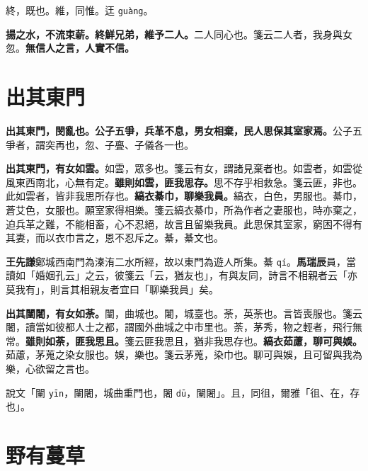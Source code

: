 \begin{quoting}終，既也。維，同惟。迋 \texttt{guàng}。\end{quoting}

\textbf{揚之水，不流束薪。終鮮兄弟，維予二人。}{\footnotesize 二人同心也。箋云二人者，我身與女忽。}\textbf{無信人之言，人實不信。}

\section{出其東門}


\textbf{出其東門，閔亂也。公子五爭，兵革不息，男女相棄，民人思保其室家焉。}{\footnotesize 公子五爭者，謂突再也，忽、子亹、子儀各一也。}

\textbf{出其東門，有女如雲。}{\footnotesize 如雲，眾多也。箋云有女，謂諸見棄者也。如雲者，如雲從風東西南北，心無有定。}\textbf{雖則如雲，匪我思存。}{\footnotesize 思不存乎相救急。箋云匪，非也。此如雲者，皆非我思所存也。}\textbf{縞衣綦巾，聊樂我員。}{\footnotesize 縞衣，白色，男服也。綦巾，蒼艾色，女服也。願室家得相樂。箋云縞衣綦巾，所為作者之妻服也，時亦棄之，迫兵革之難，不能相畜，心不忍絕，故言且留樂我員。此思保其室家，窮困不得有其妻，而以衣巾言之，恩不忍斥之。綦，綦文也。}

\begin{quoting}\textbf{王先謙}鄭城西南門為溱洧二水所經，故以東門為遊人所集。綦 \texttt{qí}。\textbf{馬瑞辰}員，當讀如「婚姻孔云」之云，彼箋云「云，猶友也」，有與友同，詩言不相親者云「亦莫我有」，則言其相親友者宜曰「聊樂我員」矣。\end{quoting}

\textbf{出其闉闍，有女如荼。}{\footnotesize 闉，曲城也。闍，城臺也。荼，英荼也。言皆喪服也。箋云闍，讀當如彼都人士之都，謂國外曲城之中市里也。荼，茅秀，物之輕者，飛行無常。}\textbf{雖則如荼，匪我思且。}{\footnotesize 箋云匪我思且，猶非我思存也。}\textbf{縞衣茹藘，聊可與娛。}{\footnotesize 茹藘，茅蒐之染女服也。娛，樂也。箋云茅蒐，染巾也。聊可與娛，且可留與我為樂，心欲留之言也。}

\begin{quoting}說文「闉 \texttt{yīn}，闉闍，城曲重門也，闍 \texttt{dū}，闉闍」。且，同徂，爾雅「徂、在，存也」。\end{quoting}

\section{野有蔓草}

